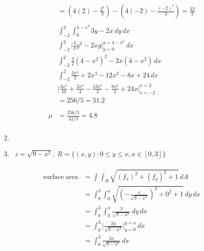 \documentclass[11pt]{article}
\newcommand\Item[1][]{%
  \ifx\relax#1\relax  \item \else \item[#1] \fi
  \abovedisplayskip=0pt\abovedisplayshortskip=0pt~\vspace*{-\baselineskip}}
\begin{document}
\begin{preview}
\begin{enumerate}
\begin{enumerate}
\begin{align*}
                          & = (4(2)-\frac{2^{3}}{3}) - (4(-2)-\frac{(-2)^{3}}{3}) = \frac{32}{3}                       \\\\
                          & \int_{-2}^{2} \int_{0}^{4-x^{2}} 3y - 2x \,dy  \,dx                                        \\
                          & \int_{-2}^{2} \Big| \frac{3}{2}y^2 - 2xy \Big|_{y=0}^{y=4-x^{2}}  \,dx                     \\
                          & \int_{-2}^{2} \frac{3}{2}(4-x^{2})^2 - 2x(4-x^{2})  \,dx                                   \\
                          & \int_{-2}^{2} \frac{3x^4}{2}+2x^3-12x^2-8x+24 \,dx                                         \\
                          & \Big| \frac{3x^5}{10}+\frac{2x^4}{4}-\frac{12x^3}{3}-\frac{8x^2}{2}+24x \Big|_{x=-2}^{x=2} \\
                          & = 256/5 = 51.2                                                                             \\\\
                      \mu & = \frac{256/5}{32/3} = 4.8                                                                 \\
                  \end{align*}
                  \Item $z=\sqrt{9-x^{2}}, \; R = \{(x,y) : 0 \le y \le x, x \in [0,3]\}$ \\\\
                  \begin{align*}
                      \mathrm{surface \; area} & = \int \int_R \sqrt{(f_{x})^2 + (f_{y})^2 +1} \, dA                                           \\
                                               & = \int_{0}^{3} \int_{0}^{x} \sqrt{\left(-\frac{x}{\sqrt{9-x^2}}\right)^2 + 0^2 + 1} \,dy \,dx \\
                                               & = \int_{0}^{3} \int_{0}^{x} \frac{3}{\sqrt{9-x^{2}}} \,dy \,dx                                \\
                                               & = \int_{0}^{3} \Big| \frac{3y}{\sqrt{9-x^{2}}} \Big|_{y=0}^{y=x} \,dx                         \\
                                               & = \int_{0}^{3} \frac{3x}{\sqrt{9-x^{2}}} \,dx                                                 \\

\end{align*}
\end{enumerate}
\end{enumerate}
\end{preview}
\end{document}

